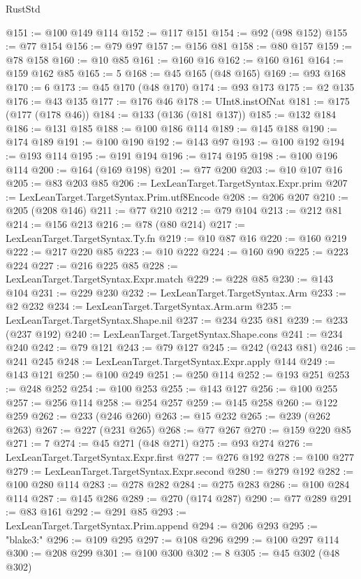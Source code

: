 \begin{lexlean}{RustStd}
\begin{coremodule}
@151 := @100 @149 @114
@152 := @117 @151
@154 := @92 (@98 @152)
@155 := @77 @154
@156 := @79 @97
@157 := @156 @81
@158 := @80 @157
@159 := @78 @158
@160 := @10 @85
@161 := @160 @16
@162 := @160 @161
@164 := @159 @162 @85
@165 := 5
@168 := @45 @165 (@48 @165)
@169 := @93 @168
@170 := 6
@173 := @45 @170 (@48 @170)
@174 := @93 @173
@175 := @2 @135
@176 := @43 @135
@177 := @176 @46
@178 := UInt8.instOfNat
@181 := @175 (@177 (@178 @46))
@184 := @133 (@136 (@181 @137))
@185 := @132 @184
@186 := @131 @185
@188 := @100 @186 @114
@189 := @145 @188
@190 := @174 @189
@191 := @100 @190
@192 := @143 @97
@193 := @100 @192
@194 := @193 @114
@195 := @191 @194
@196 := @174 @195
@198 := @100 @196 @114
@200 := @164 (@169 @198)
@201 := @77 @200
@203 := @10 @107 @16
@205 := @83 @203 @85
@206 := LexLeanTarget.TargetSyntax.Expr.prim
@207 := LexLeanTarget.TargetSyntax.Prim.utf8Encode
@208 := @206 @207
@210 := @205 (@208 @146)
@211 := @77 @210
@212 := @79 @104
@213 := @212 @81
@214 := @156 @213
@216 := @78 (@80 @214)
@217 := LexLeanTarget.TargetSyntax.Ty.fn
@219 := @10 @87 @16
@220 := @160 @219
@222 := @217 @220 @85
@223 := @10 @222
@224 := @160 @90
@225 := @223 @224
@227 := @216 @225 @85
@228 := LexLeanTarget.TargetSyntax.Expr.match
@229 := @228 @85
@230 := @143 @104
@231 := @229 @230
@232 := LexLeanTarget.TargetSyntax.Arm
@233 := @2 @232
@234 := LexLeanTarget.TargetSyntax.Arm.arm
@235 := LexLeanTarget.TargetSyntax.Shape.nil
@237 := @234 @235 @81
@239 := @233 (@237 @192)
@240 := LexLeanTarget.TargetSyntax.Shape.cons
@241 := @234 @240
@242 := @79 @121
@243 := @79 @127
@245 := @242 (@243 @81)
@246 := @241 @245
@248 := LexLeanTarget.TargetSyntax.Expr.apply @144
@249 := @143 @121
@250 := @100 @249
@251 := @250 @114
@252 := @193 @251
@253 := @248 @252
@254 := @100 @253
@255 := @143 @127
@256 := @100 @255
@257 := @256 @114
@258 := @254 @257
@259 := @145 @258
@260 := @122 @259
@262 := @233 (@246 @260)
@263 := @15 @232
@265 := @239 (@262 @263)
@267 := @227 (@231 @265)
@268 := @77 @267
@270 := @159 @220 @85
@271 := 7
@274 := @45 @271 (@48 @271)
@275 := @93 @274
@276 := LexLeanTarget.TargetSyntax.Expr.first
@277 := @276 @192
@278 := @100 @277
@279 := LexLeanTarget.TargetSyntax.Expr.second
@280 := @279 @192
@282 := @100 @280 @114
@283 := @278 @282
@284 := @275 @283
@286 := @100 @284 @114
@287 := @145 @286
@289 := @270 (@174 @287)
@290 := @77 @289
@291 := @83 @161
@292 := @291 @85
@293 := LexLeanTarget.TargetSyntax.Prim.append
@294 := @206 @293
@295 := "blake3:"
@296 := @109 @295
@297 := @108 @296
@299 := @100 @297 @114
@300 := @208 @299
@301 := @100 @300
@302 := 8
@305 := @45 @302 (@48 @302)

\end{coremodule}
\end{lexlean}

